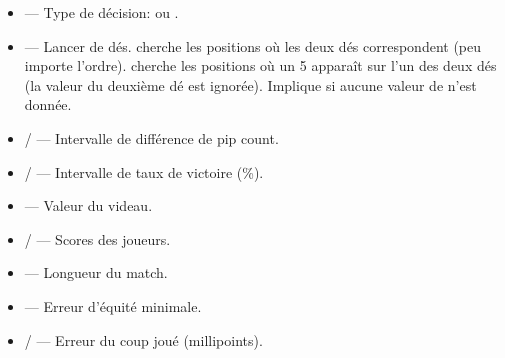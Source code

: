 \documentclass[letterpaper,10pt,french]{sphinxmanual}
\begin{document}
\sphinxAtStartPar
{}
\begin{itemize}
\item {} 
\sphinxAtStartPar
{} — Type de décision:  ou .

\item {} 
\sphinxAtStartPar
{} — Lancer de dés.  cherche les positions où les deux dés
correspondent (peu importe l’ordre).  cherche les positions où un 5
apparaît sur l’un des deux dés (la valeur du deuxième dé est ignorée).
Implique  si aucune valeur de  n’est
donnée.

\item {} 
\sphinxAtStartPar
{} /  — Intervalle de différence de pip count.

\item {} 
\sphinxAtStartPar
{} /  — Intervalle de taux de victoire (\%).

\item {} 
\sphinxAtStartPar
{} — Valeur du videau.

\item {} 
\sphinxAtStartPar
{} /  — Scores des joueurs.

\item {} 
\sphinxAtStartPar
{} — Longueur du match.

\item {} 
\sphinxAtStartPar
{} — Erreur d’équité minimale.

\item {} 
\sphinxAtStartPar
{} /  — Erreur du coup joué (millipoints).


\end{itemize}
\end{document}
